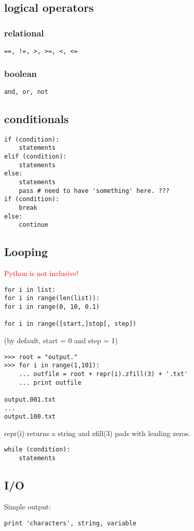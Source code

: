 \documentclass{article}
\begin{document}
\begin{multicols}{2}
\subsection{logical operators}
\subsubsection{relational}
\begin{lstlisting}
==, !=, >, >=, <, <=
\end{lstlisting}
\subsubsection{boolean}
\begin{lstlisting}
and, or, not
\end{lstlisting}
\columnbreak

\subsection{conditionals}
\begin{lstlisting}
if (condition):
    statements
elif (condition):
    statements
else:
    statements
    pass # need to have 'something' here. ???
if (condition):
    break
else:
    continue
\end{lstlisting}

\subsection{Looping}
\textcolor{red}{Python is not inclusive!}

\begin{lstlisting}
for i in list:
for i in range(len(list)):
for i in range(0, 10, 0.1)

for i in range([start,]stop[, step])
\end{lstlisting}
(by default, start = 0 and step = 1)
\begin{lstlisting}
>>> root = "output."
>>> for i in range(1,101):
    ... outfile = root + repr(i).zfill(3) + '.txt'
    ... print outfile

output.001.txt
...
output.100.txt
\end{lstlisting}
repr(i) returns a string and zfill(3) pads with leading zeros.
\begin{lstlisting}
while (condition):
    statements
\end{lstlisting}

\subsection{I/O}
Simple output:
\begin{lstlisting}
print 'characters', string, variable
\end{lstlisting}


\end{multicols}
\end{document}
